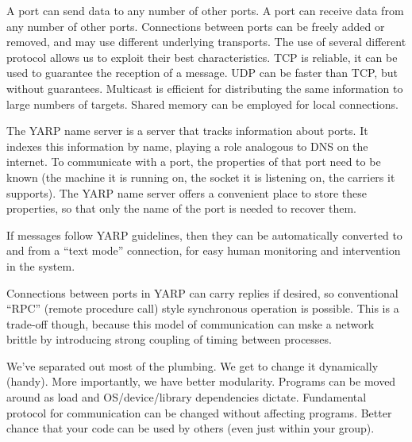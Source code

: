 A port can send data to any number of other ports. A port can receive
data from any number of other ports. Connections between ports can be
freely added or removed, and may use different underlying transports.
 The use of several different protocol allows us to exploit
their best characteristics.
TCP is reliable, it can be used to guarantee the reception of a message.
UDP can be faster than TCP, but without guarantees.
Multicast is efficient for distributing the same information to large
numbers of targets.
Shared memory can be employed for local connections.

The YARP name server is a server that tracks information about
ports. It indexes this information by name, playing a role analogous
to DNS on the internet. To communicate with a port, the properties of
that port need to be known (the machine it is running on, the socket
it is listening on, the carriers it supports). The YARP name server
offers a convenient place to store these properties, so that only the
name of the port is needed to recover them.






If messages follow YARP guidelines, then they can be
automatically converted to and from a ``text mode'' connection, for easy
human monitoring and intervention in the system.

Connections between ports in YARP can carry replies if desired,
so conventional ``RPC'' (remote procedure call) style synchronous
operation is possible.  This is a trade-off though, because this
model of communication can mske a network brittle by introducing
strong coupling of timing between processes.


We've separated out most of the plumbing.  We get to change it
dynamically (handy).  More importantly, we have better modularity.
Programs can be moved around as load and OS/device/library
dependencies dictate.  Fundamental protocol for communication can be
changed without affecting programs.  Better chance that your code can
be used by others (even just within your group).



